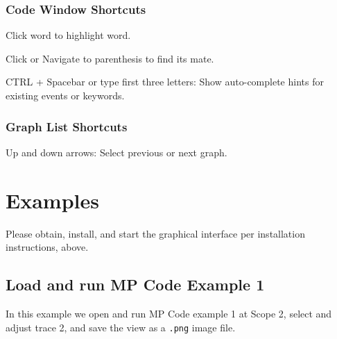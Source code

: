 \documentclass[11pt,fleqn]{article} %
\begin{document}
\subsubsection{Code Window Shortcuts}
\begin{compactitem}
\item Click word to highlight word.
\item Click or Navigate to parenthesis to find its mate.
\item CTRL + Spacebar or type first three letters: Show auto-complete hints for existing events or keywords.
\end{compactitem}

\subsubsection{Graph List Shortcuts}
\begin{compactitem}
\item Up and down arrows: Select previous or next graph.
\end{compactitem}

\section{Examples}
Please obtain, install, and start the \ggui graphical interface per installation instructions, above.
\subsection{Load and run MP Code Example 1}
In this example we open and run MP Code example 1 at Scope 2, select and adjust trace 2, and save the view as a \verb+.png+ image file.
\end{document}
